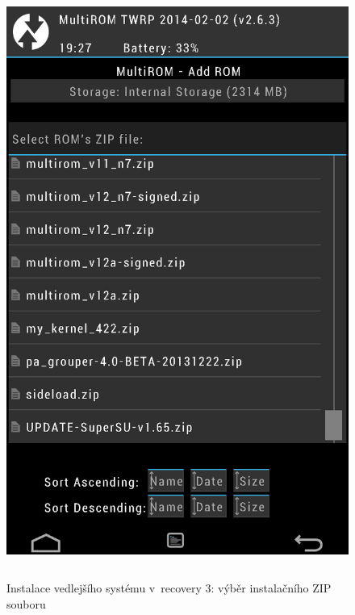 \documentclass[12pt, a4paper, oneside]{article}
\begin{document}
\begin{figure}[H]
\begin{center}
 \includegraphics[height=550pt]{../img/recovery_install3.png}
\caption{Instalace vedlejšího systému v~recovery 3: výběr instalačního ZIP souboru}
\end{center}
\end{figure}
\end{document}
